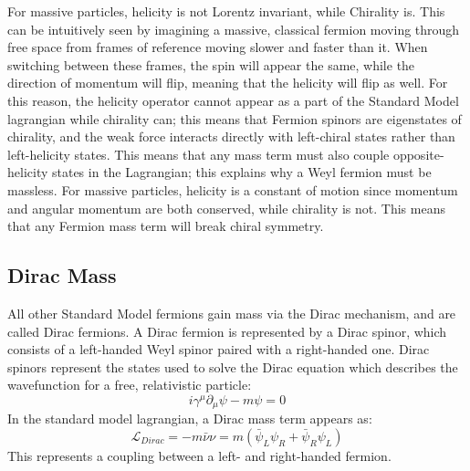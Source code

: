 \documentclass[/main.tex]{subfiles}
\begin{document}
For massive particles, helicity is not Lorentz invariant, while Chirality is.
This can be intuitively seen by imagining a massive, classical fermion moving through free space from frames of reference moving slower and faster than it.
When switching between these frames, the spin will appear the same, while the direction of momentum will flip, meaning that the helicity will flip as well.
For this reason, the helicity operator cannot appear as a part of the Standard Model lagrangian while chirality can; this means that Fermion spinors are eigenstates of chirality, and the weak force interacts directly with left-chiral states rather than left-helicity states.
This means that any mass term must also couple opposite-helicity states in the Lagrangian; this explains why a Weyl fermion must be massless.
For massive particles, helicity is a constant of motion since momentum and angular momentum are both conserved, while chirality is not.
This means that any Fermion mass term will break chiral symmetry.

\subsection{Dirac Mass} \label{sec:diracmass}
All other Standard Model fermions gain mass via the Dirac mechanism, and are called Dirac fermions\cite{Dirac1928}.
A Dirac fermion is represented by a Dirac spinor, which consists of a left-handed Weyl spinor paired with a right-handed one.
Dirac spinors represent the states used to solve the Dirac equation which describes the wavefunction for a free, relativistic particle:
\begin{equation}
  i\gamma^\mu \partial_\mu \psi - m\psi = 0
\end{equation}
In the standard model lagrangian, a Dirac mass term appears as:
\begin{equation}
  \mathcal{L}_{Dirac}=-m\bar\nu\nu=m(\bar\psi_L\psi_R+\bar\psi_R\psi_L)
\end{equation}
This represents a coupling between a left- and right-handed fermion.
\end{document}
